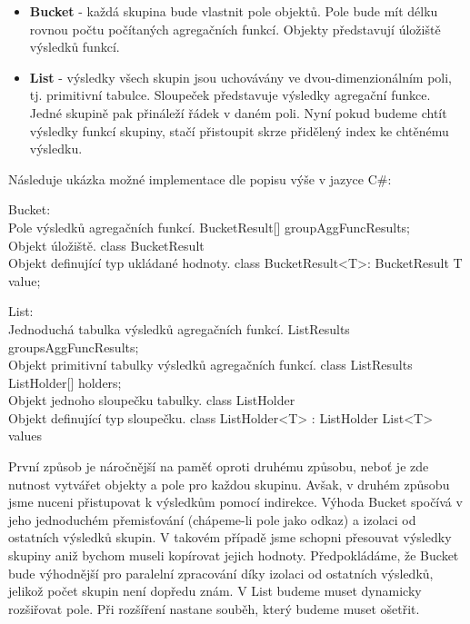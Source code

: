 \begin{itemize}

\item \textbf{Bucket} - každá skupina bude vlastnit pole objektů. 
Pole bude mít délku rovnou počtu počítaných agregačních funkcí.
Objekty představují úložiště výsledků funkcí.

\item \textbf{List} - výsledky všech skupin jsou uchovávány ve dvou-dimenzionálním poli, tj. primitivní tabulce.
Sloupeček představuje výsledky agregační funkce.
Jedné skupině pak přináleží řádek v daném poli.
Nyní pokud budeme chtít výsledky funkcí skupiny, stačí přistoupit skrze přidělený index ke chtěnému výsledku.
\end{itemize}

Následuje ukázka možné implementace dle popisu výše v jazyce C\#:
\begin{code}
Bucket:
\\ Pole výsledků agregačních funkcí.
BucketResult[] groupAggFuncResults; 
\\ Objekt úložiště. 
class BucketResult {} 
\\ Objekt definující typ ukládané hodnoty.
class BucketResult<T>: BucketResult { T value; }

List:
\\ Jednoduchá tabulka výsledků agregačních funkcí.
ListResults groupsAggFuncResults;
\\ Objekt primitivní tabulky výsledků agregačních funkcí.
class ListResults { ListHolder[] holders; }
\\ Objekt jednoho sloupečku tabulky.
class ListHolder {}
\\ Objekt definující typ sloupečku.
class ListHolder<T> : ListHolder { List<T> values }
\end{code}

První způsob je náročnější na paměť oproti druhému způsobu, neboť je zde nutnost vytvářet objekty a pole pro každou skupinu.
Avšak, v druhém způsobu jsme nuceni přistupovat k výsledkům pomocí indirekce.
Výhoda Bucket spočívá v jeho jednoduchém přemisťování (chápeme-li pole jako odkaz) a izolaci od ostatních výsledků skupin.
V takovém případě jsme schopni přesouvat výsledky skupiny aniž bychom museli kopírovat jejich hodnoty.
Předpokládáme, že Bucket bude výhodnější pro paralelní zpracování díky izolaci od ostatních výsledků, jelikož počet skupin není dopředu znám.
V List budeme muset dynamicky rozšiřovat pole.
Při rozšíření nastane souběh, který budeme muset ošetřit.

